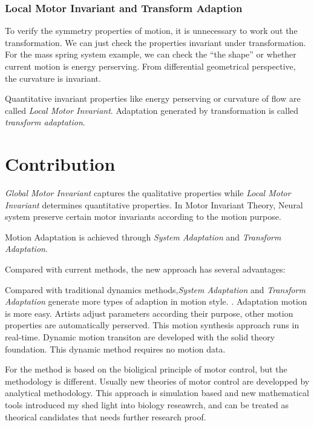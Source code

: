 \subsubsection*{Local Motor Invariant and Transform Adaption}
To verify the symmetry properties of motion, it is unnecessary to work out the transformation. 
We can just check the properties invariant under transformation.
For the mass spring system example, we can check the ``the shape'' or whether current motion is energy perserving. 
From differential geometrical perspective,  the curvature is invariant. 


Quantitative invariant properties like energy perserving or curvature of flow are called \emph{Local Motor Invariant}. 
Adaptation generated by transformation is called \emph{transform adaptation}.

\section{Contribution}
\emph{Global Motor Invariant} captures the qualitative properties while \emph{Local Motor Invariant} determines quantitative properties. 
In Motor Invariant Theory,  Neural system preserve certain motor invariants according to the motion purpose. 

Motion Adaptation is achieved through \emph{System Adaptation} and \emph{Transform Adaptation}.

Compared with current \cms methods, the new approach has several advantages:
\begin{enumerate}
Compared with traditional dynamics \cms methods,\emph{System Adaptation} and \emph{Transform Adaptation} generate more types of adaption in motion style.
.
Adaptation motion is more easy. 
Artists  adjust  parameters according their purpose, other motion properties are automatically perserved.
This motion synthesis approach runs in real-time.
Dynamic motion transiton are developed with the solid theory foundation.
This dynamic method requires no motion data.

\end{enumerate}

For the method is based on the bioligical principle of motor control, but the methodology is different.
Usually new  theories of motor control are developped by analytical methodology.
This approach is simulation based and new mathematical tools introduced my shed light into biology reseawrch, and can be treated as theorical candidates that needs further research proof.

